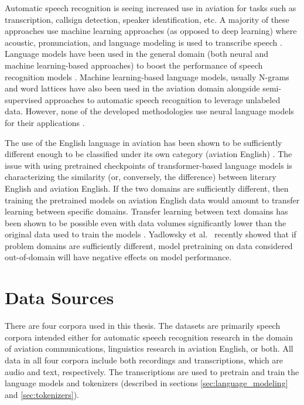 \documentclass[12pt]{article}
\begin{document}
Automatic speech recognition is seeing increased use in aviation for tasks such as transcription, callsign detection, speaker identification,
etc. A majority of these approaches use machine learning approaches (as opposed to deep learning) where acoustic, pronunciation, and language
modeling is used to transcribe speech
\cite{guo_comparative_2022,smidl_air_2019,zuluaga-gomez_automatic_2020,badrinath_automatic_2022,hofbauer_atcosim_2008,helmke_quantifying_2017}.
Language models have been used in the general domain (both neural and machine learning-based approaches) to boost the performance of speech
recognition models \cite{han_contextnet_2020,kriman_quartznet_2020,majumdar_citrinet_2021}. Machine learning-based language models, usually N-grams
and word lattices have also been used in the aviation domain alongside semi-supervised approaches to automatic speech recognition to leverage
unlabeled data. However, none of the developed methodologies use neural language models for their applications
\cite{zuluaga-gomez_contextual_2021,srinivasamurthy_semi-supervised_2017,badrinath_automatic_2022}.

The use of the English language in aviation has been shown to be sufficiently different enough to be classified under its own category (aviation
English) \cite{paltridge_handbook_2013}. The issue with using pretrained checkpoints of transformer-based language models is characterizing the
similarity (or, conversely, the difference) between literary English and aviation English. If the two domains are sufficiently different, then
training the pretrained models on aviation English data would amount to transfer learning between specific domains. Transfer learning between text
domains has been shown to be possible even with data volumes significantly lower than the original data used to train the models
\cite{raffel_exploring_2020}. Yadlowsky et al.~\cite{yadlowsky_pretraining_2023} recently showed that if problem domains are sufficiently different,
model pretraining on data considered out-of-domain will have negative effects on model performance.

\section{Data Sources}\label{sec:data_source}
There are four corpora used in this thesis. The datasets are primarily speech corpora intended either for automatic speech recognition research in the
domain of aviation communications, linguistics research in aviation English, or both. All data in all four corpora include both recordings and
transcriptions, which are audio and text, respectively. The transcriptions are used to pretrain and train the language models and tokenizers
(described in sections \ref{sec:language_modeling} and \ref{sec:tokenizers}).
\end{document}
